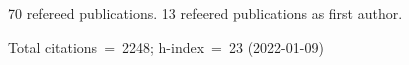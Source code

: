 70 refereed publications. 13 refeered publications as first author.

Total citations~=~2248; h-index~=~23 (2022-01-09)